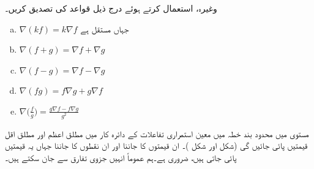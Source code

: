 وغیرہ،  استعمال کرتے ہوئے درج ذیل قواعد کی تصدیق کریں۔
\begin{enumerate}[a.]
\item
$\nabla(kf)=k\nabla f$\quad
جہاں  مستقل ہے
\item
$\nabla (f+g)=\nabla f+\nabla g$
\item
$\nabla (f-g)=\nabla f-\nabla g$
\item
$\nabla (fg)=f\nabla g+g\nabla f$
\item
$\nabla\big(\frac{f}{g}\big)=\frac{g\nabla f-f\nabla g}{g^2}$
\end{enumerate}

مستوی  میں محدود   بند خطہ میں معین  استمراری تفاعلات  کے   دائرہ کار میں مطلق اعظم  اور مطلق اقل قیمتیں پائی جائیں گی (شکل  اور شکل )۔ ان قیمتوں  کا جاننا اور ان نقطوں کا  جاننا    جہاں یہ قیمتیں پائی جاتی ہیں،  ضروری ہے۔ہم   عموماً  انہیں جزوی تفارق  سے   جان سکتے ہیں۔

